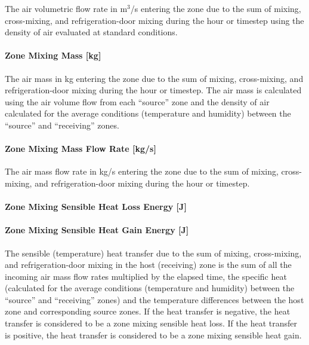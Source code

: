 The air volumetric flow rate in m\(^{3}\)/s entering the zone due to the sum of mixing, cross-mixing, and refrigeration-door mixing during the hour or timestep using the density of air evaluated at standard conditions.

\paragraph{Zone Mixing Mass {[}kg{]}}\label{zone-mixing-mass-kg}

The air mass in kg entering the zone due to the sum of mixing, cross-mixing, and refrigeration-door mixing during the hour or timestep. The air mass is calculated using the air volume flow from each ``source'' zone and the density of air calculated for the average conditions (temperature and humidity) between the ``source'' and ``receiving'' zones.

\paragraph{Zone Mixing Mass Flow Rate {[}kg/s{]}}\label{zone-mixing-mass-flow-rate-kgs}

The air mass flow rate in kg/s entering the zone due to the sum of mixing, cross-mixing, and refrigeration-door mixing during the hour or timestep.

\paragraph{Zone Mixing Sensible Heat Loss Energy {[}J{]}}\label{zone-mixing-sensible-heat-loss-energy-j}

\paragraph{Zone Mixing Sensible Heat Gain Energy {[}J{]}}\label{zone-mixing-sensible-heat-gain-energy-j}

The sensible (temperature) heat transfer due to the sum of mixing, cross-mixing, and refrigeration-door mixing in the host (receiving) zone is the sum of all the incoming air mass flow rates multiplied by the elapsed time, the specific heat (calculated for the average conditions (temperature and humidity) between the ``source'' and ``receiving'' zones) and the temperature differences between the host zone and corresponding source zones. If the heat transfer is negative, the heat transfer is considered to be a zone mixing sensible heat loss. If the heat transfer is positive, the heat transfer is considered to be a zone mixing sensible heat gain.

